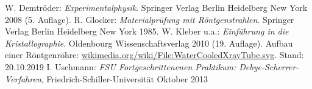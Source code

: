 \documentclass[a4paper,twoside,final]{article}
\begin{document}

\begin{thebibliography}{xxx}
	W. Demtröder: \textit{Experimentalphysik}. Springer Verlag Berlin Heidelberg New York 2008 (5. Auflage).
	R. Glocker: \textit{Materialprüfung mit Röntgenstrahlen}. Springer Verlag Berlin Heidelberg New York 1985.
	W. Kleber u.a.: \textit{Einführung in die Kristallographie}. Oldenbourg Wissenschaftsverlag 2010 (19. Auflage).
  Aufbau einer Röntgenröhre: \url{wikimedia.org/wiki/File:WaterCooledXrayTube.svg}. Stand: 20.10.2019
  I. Uschmann: \textit{FSU Fortgeschrittenenen Praktikum: Debye-Scherrer-Verfahren}, Fried\-rich-Schil\-ler-Uni\-versi\-tät Oktober 2013
\end{thebibliography}
\end{document}
